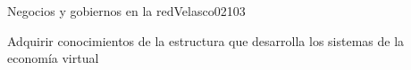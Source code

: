 \begin{syllabus}
\begin{unit}{Negocios y gobiernos en la red}{Velasco02}{10}{3}
   \begin{learningoutcomes}
      \item Adquirir conocimientos de la estructura que desarrolla los sistemas de la economía virtual
   \end{learningoutcomes}
\end{unit}

\begin{coursebibliography}
\end{coursebibliography}
\end{syllabus}
